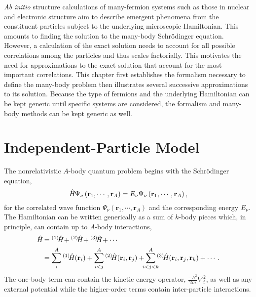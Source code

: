 \documentclass[thesis.tex]{subfiles}
\begin{document}
\emph{Ab initio} structure calculations of many-fermion systems such as those in nuclear and electronic structure aim to describe emergent phenomena from the constituent particles subject to the underlying microscopic Hamiltonian.  This amounts to finding the solution to the many-body Schr\"{o}dinger equation.  However, a calculation of the exact solution needs to account for all possible correlations among the particles and thus scales factorially.  This motivates the need for approximations to the exact solution that account for the most important correlations.  This chapter first establishes the formalism necessary to define the many-body problem then illustrates several successive approximations to its solution.  Because the type of fermions and the underlying Hamiltonian can be kept generic until specific systems are considered, the formalism and many-body methods can be kept generic as well.


\section{Independent-Particle Model}
The nonrelativistic $A$-body quantum problem begins with the Schr\"{o}dinger equation,
\begin{equation} \label{eq:schrodinger}
  \hat{H}\hspace{-1pt}\Psi_{\nu}\left(\mathbf{r}_{1},\cdots,\mathbf{r}_{A}\right) = E_{\nu}\Psi_{\nu}\left(\mathbf{r}_{1},\cdots,\mathbf{r}_{A}\right),
\end{equation}
for the correlated wave function $\Psi_{\nu}\left(\mathbf{r}_{1},\cdots,\mathbf{r}_{A}\right)$ and the corresponding energy $E_{\nu}$.  The Hamiltonian can be written generically as a sum of $k$-body pieces which, in principle, can contain up to $A$-body interactions,
\begin{align} \label{eq:hamiltonian}
  \Ham &= \HamB{1} + \HamB{2} + \HamB{3} + \cdots \notag \\
  &= \sum^{A}_{\mathclap{i}}\HamB{1}\left(\mathbf{r}_{i}\right) + \sum^{A}_{\mathclap{i<j}}\HamB{2}\left(\mathbf{r}_{i},\mathbf{r}_{j}\right) + \sum^{A}_{\mathclap{i<j<k}}\HamB{3}\left(\mathbf{r}_{i},\mathbf{r}_{j},\mathbf{r}_{k}\right) + \cdots.
\end{align}
The one-body term can contain the kinetic energy operator, $\frac{-\hbar^{2}}{2m}\nabla^{2}_{i}$, as well as any external potential while the higher-order terms contain inter-particle interactions.
\end{document}
